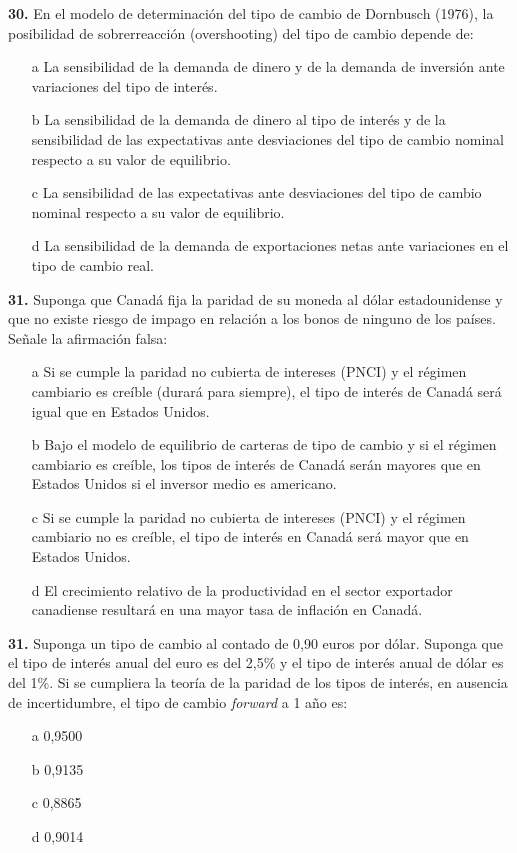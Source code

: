 \documentclass{nuevotema}
\begin{document}
\textbf{30.} En el modelo de determinación del tipo de cambio de Dornbusch (1976), la posibilidad de sobrerreacción (overshooting) del tipo de cambio depende de:
\begin{enumerate}
	\item[a] La sensibilidad de la demanda de dinero y de la demanda de inversión ante variaciones del tipo de interés.
	\item[b] La sensibilidad de la demanda de dinero al tipo de interés y de la sensibilidad de las expectativas ante desviaciones del tipo de cambio nominal respecto a su valor de equilibrio.
	\item[c] La sensibilidad de las expectativas ante desviaciones del tipo de cambio nominal respecto a su valor de equilibrio.
	\item[d] La sensibilidad de la demanda de exportaciones netas ante variaciones en el tipo de cambio real.
\end{enumerate}

\textbf{31.} Suponga que Canadá fija la paridad de su moneda al dólar estadounidense y que no existe riesgo de impago en relación a los bonos de ninguno de los países. Señale la afirmación falsa:
\begin{enumerate}
	\item[a] Si se cumple la paridad no cubierta de intereses (PNCI) y el régimen cambiario es creíble (durará para siempre), el tipo de interés de Canadá será igual que en Estados Unidos.
	\item[b] Bajo el modelo de equilibrio de carteras de tipo de cambio y si el régimen cambiario es creíble, los tipos de interés de Canadá serán mayores que en Estados Unidos si el inversor medio es americano.
	\item[c] Si se cumple la paridad no cubierta de intereses (PNCI) y el régimen cambiario no es creíble, el tipo de interés en Canadá será mayor que en Estados Unidos.
	\item[d] El crecimiento relativo de la productividad en el sector exportador canadiense resultará en una mayor tasa de inflación en Canadá.
\end{enumerate}


\textbf{31.} Suponga un tipo de cambio al contado de 0,90 euros por dólar. Suponga que el tipo de interés anual del euro es del 2,5\% y el tipo de interés anual de dólar es del 1\%. Si se cumpliera la teoría de la paridad de los tipos de interés, en ausencia de incertidumbre, el tipo de cambio \textit{forward} a 1 año es:
\begin{enumerate}
	\item[a] 0,9500
	\item[b] 0,9135
	\item[c] 0,8865
	\item[d] 0,9014
\end{enumerate}
\end{document}
